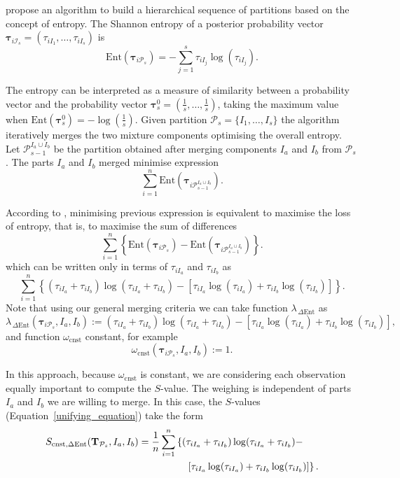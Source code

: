 \documentclass[submit]{smj}
\theoremstyle{definition}
\newcommand{\m}[1]{\boldsymbol{#1}}
\begin{document}
\cite{baudry2010combining} propose an algorithm to build a hierarchical sequence of partitions based on the concept of entropy. The Shannon entropy of a posterior probability vector $\m\tau_{i \mathcal{I}_s} = \left( \tau_{i I_1} , \dots, \tau_{i I_s}  \right)$ is
\[
\text{Ent}( \m\tau_{i \mathcal{P}_s} ) = -\sum_{j=1}^s \tau_{i I_j}  \log(\tau_{i I_j} ).
\]

The entropy can be interpreted as a measure of similarity between a probability vector and the probability vector $\m\tau^0_{s}=\left(\frac{1}{s}, \dots, \frac{1}{s}\right)$, taking the maximum value when $\text{Ent}\left( \m\tau^0_{s} \right) = -\log(\frac{1}{s})$. Given partition $\mathcal{P}_s = \{ I_1, \dots, I_s\}$ the algorithm iteratively merges  the two mixture components optimising the overall entropy. Let $\mathcal{P}_{s-1}^{I_a\cup I_b}$ be the partition obtained after merging components $I_a$ and $I_b$ from $\mathcal{P}_s$. The parts $I_a$ and $I_b$ merged minimise expression
\[
\sum_{i=1}^n \text{Ent}( \m\tau_{i \mathcal{P}_{s-1}^{I_a\cup I_b}} ).
\]

According to \cite{baudry2010combining}, minimising previous expression is equivalent to maximise the loss of entropy, that is, to maximise the sum of differences
\[
\sum_{i=1}^n  \left\{ \text{Ent}( \m\tau_{i \mathcal{P}_s} ) - \text{Ent}( \m\tau_{i \mathcal{P}_{s-1}^{I_a\cup I_b}} ) \right\}.
\]
which can be written only in terms of $\tau_{i I_a}$  and $\tau_{i I_b}$ as
\begin{equation}\label{entropy}
\sum_{i=1}^n   \left\{(\tau_{iI_a}+\tau_{iI_b}) \log(\tau_{iI_a} + \tau_{iI_b}) - \left[\tau_{iI_a} \log(\tau_{iI_a}) + \tau_{iI_b} \log(\tau_{iI_b})\right] \right\}.
\end{equation}
Note that using our general merging criteria we can take function $\lambda_{\,\Delta\text{Ent}}$ as
\[
\lambda_{\,\Delta\text{Ent}}(\m\tau_{i \mathcal{P}_s},  I_a,  I_b) :=  (\tau_{iI_a}+\tau_{iI_b}) \log(\tau_{iI_a} + \tau_{iI_b}) - \left[ \tau_{iI_a} \log(\tau_{iI_a}) + \tau_{iI_b} \log(\tau_{iI_b}) \right],
\]
and function $\omega_{\text{cnst}}$ constant, for example 
\[
\omega_{\text{cnst}}(\m\tau_{i \mathcal{P}_s},  I_a,  I_b) := 1.
\]

In this approach, because $\omega_{\text{cnst}}$ is constant,  we are considering each observation equally important to compute the $S$-value. The weighing is independent of parts $I_a$ and $I_b$ we are willing to merge. In this case, the $S$-values (Equation~\ref{unifying_equation}) take the form
\[
\begin{split}
S_{\text{cnst}, \Delta\text{Ent}}( \text{\textbf{T}}_{\mathcal{P}_s},  I_a,  I_b) = \frac{1}{n} \sum_{i=1}^n & \left\{(\tau_{iI_a}+\tau_{iI_b}) \log(\tau_{iI_a} + \tau_{iI_b}) - \right.\\ 
&\quad \left.\left[ \tau_{iI_a} \log(\tau_{iI_a}) + \tau_{iI_b} \log(\tau_{iI_b}) \right]\right\}.
\end{split}
\]
\end{document}
